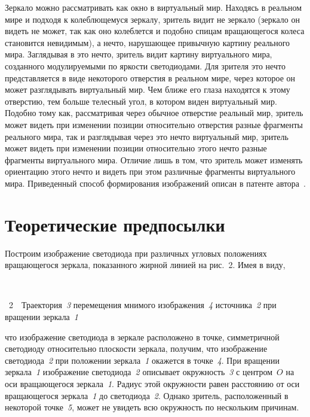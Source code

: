\begin{multicols}{2}
 
  Зеркало можно рассматривать как окно в виртуальный мир. Находясь в реальном мире 
и подходя к колеблющемуся зеркалу, зритель видит не зеркало (зеркало он видеть не 
может, так как оно колеблется и подобно спицам вращающегося колеса становится 
невидимым), а нечто, нарушающее привычную картину реального мира. Заглядывая в это 
нечто, зритель видит картину виртуального мира, созданного модулируемыми по яркости 
светодиодами. Для зрителя это нечто представляется в виде некоторого отверстия в 
реальном мире, через которое он может разглядывать виртуальный мир. Чем ближе его 
глаза находятся к этому отверстию, тем больше телесный угол, в котором виден 
виртуальный мир. Подобно тому как, рассматривая через обычное отверстие реальный 
мир, зритель может видеть при изменении позиции относительно отверстия разные 
фрагменты реального мира, так и разглядывая через это нечто виртуальный мир, зритель 
может видеть при изменении позиции относительно этого нечто разные фрагменты 
виртуального мира. Отличие лишь в том, что зритель может изменять ориентацию этого 
нечто и видеть при этом различные фрагменты виртуального мира. Приведенный способ 
формирования изображений описан в патенте автора~\cite{1t}. 

\section{Теоретические предпосылки}

  Построим изображение светодиода при различных угловых положениях вращающегося 
зеркала, показанного жирной линией на рис.~2. %
Имея в виду,\columnbreak

\vspace*{1pt}

\begin{center}
\mbox{%
\epsfxsize=41.463mm
}
\end{center}
{{\figurename~2}\ \ \small{Траектория~\textit{3} перемещения мнимого изображения~\textit{4} источника~\textit{2} при 
вращении зеркала~\textit{1}}}


\bigskip
\addtocounter{figure}{1}  



\noindent
что изображение 
светодиода в зеркале расположено в точке, симметричной светодиоду относительно 
плоскости зеркала, получим, что изображение светодиода~\textit{2} при положении 
зеркала~\textit{1} окажется в точке~\textit{4}. При вращении зеркала~\textit{1} 
изображение светодиода~\textit{2} описывает окружность~\textit{3} с центром~$O$ на оси 
вращающегося зеркала~\textit{1}. Радиус этой окружности равен расстоянию от оси 
вращающегося зеркала~\textit{1} до светодиода~\textit{2}. Однако зритель, 
расположенный в некоторой точке~\textit{5}, может не увидеть всю окружность по 
нескольким причинам. 


\end{multicols}
